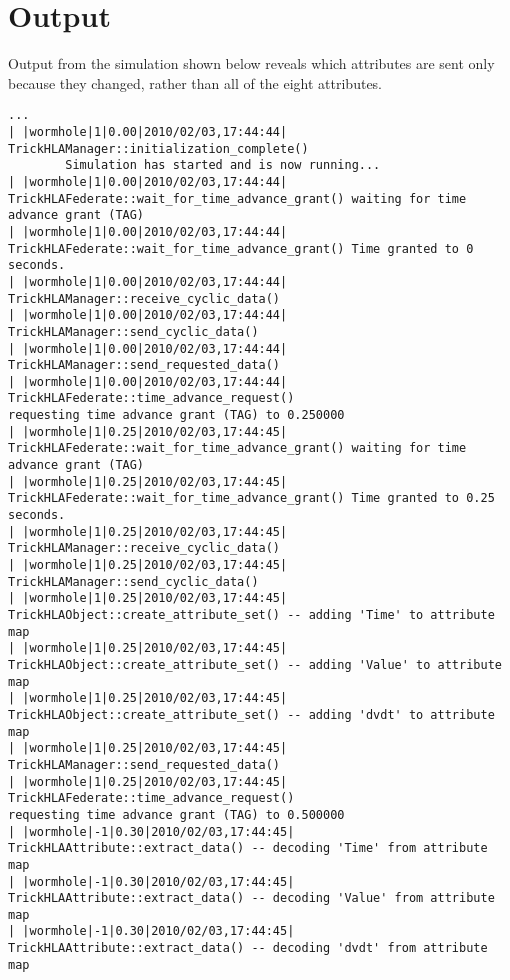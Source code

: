 \section{Output}

Output from the simulation shown below reveals which attributes are sent only
because they changed, rather than all of the eight attributes.

\begin{lstlisting}[numbers=none,caption={output showing conditionally sent cyclic data}]
    ...
| |wormhole|1|0.00|2010/02/03,17:44:44| TrickHLAManager::initialization_complete()
        Simulation has started and is now running...
| |wormhole|1|0.00|2010/02/03,17:44:44| TrickHLAFederate::wait_for_time_advance_grant() waiting for time advance grant (TAG)
| |wormhole|1|0.00|2010/02/03,17:44:44| TrickHLAFederate::wait_for_time_advance_grant() Time granted to 0 seconds.
| |wormhole|1|0.00|2010/02/03,17:44:44| TrickHLAManager::receive_cyclic_data()
| |wormhole|1|0.00|2010/02/03,17:44:44| TrickHLAManager::send_cyclic_data()
| |wormhole|1|0.00|2010/02/03,17:44:44| TrickHLAManager::send_requested_data()
| |wormhole|1|0.00|2010/02/03,17:44:44| TrickHLAFederate::time_advance_request()   
requesting time advance grant (TAG) to 0.250000
| |wormhole|1|0.25|2010/02/03,17:44:45| TrickHLAFederate::wait_for_time_advance_grant() waiting for time advance grant (TAG)
| |wormhole|1|0.25|2010/02/03,17:44:45| TrickHLAFederate::wait_for_time_advance_grant() Time granted to 0.25 seconds.
| |wormhole|1|0.25|2010/02/03,17:44:45| TrickHLAManager::receive_cyclic_data()
| |wormhole|1|0.25|2010/02/03,17:44:45| TrickHLAManager::send_cyclic_data()
| |wormhole|1|0.25|2010/02/03,17:44:45| TrickHLAObject::create_attribute_set() -- adding 'Time' to attribute map
| |wormhole|1|0.25|2010/02/03,17:44:45| TrickHLAObject::create_attribute_set() -- adding 'Value' to attribute map
| |wormhole|1|0.25|2010/02/03,17:44:45| TrickHLAObject::create_attribute_set() -- adding 'dvdt' to attribute map
| |wormhole|1|0.25|2010/02/03,17:44:45| TrickHLAManager::send_requested_data()
| |wormhole|1|0.25|2010/02/03,17:44:45| TrickHLAFederate::time_advance_request()   
requesting time advance grant (TAG) to 0.500000
| |wormhole|-1|0.30|2010/02/03,17:44:45| TrickHLAAttribute::extract_data() -- decoding 'Time' from attribute map
| |wormhole|-1|0.30|2010/02/03,17:44:45| TrickHLAAttribute::extract_data() -- decoding 'Value' from attribute map
| |wormhole|-1|0.30|2010/02/03,17:44:45| TrickHLAAttribute::extract_data() -- decoding 'dvdt' from attribute map

\end{lstlisting}
